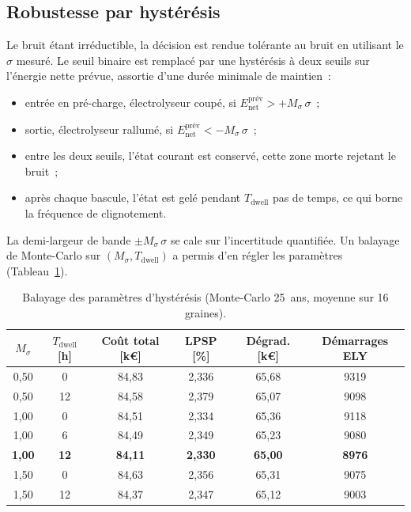 \subsection{Robustesse par hystérésis}
\label{subsec:hysteresis}

Le bruit étant irréductible, la décision est rendue tolérante au bruit en utilisant le $\sigma$ mesuré. Le seuil binaire est remplacé par une hystérésis à deux seuils sur l'énergie nette prévue, assortie d'une durée minimale de maintien~:
\begin{itemize}
  \setlength\itemsep{1pt}
  \item entrée en pré-charge, électrolyseur coupé, si $E_{\text{net}}^{\text{prév}} > +M_\sigma\,\sigma$~;
  \item sortie, électrolyseur rallumé, si $E_{\text{net}}^{\text{prév}} < -M_\sigma\,\sigma$~;
  \item entre les deux seuils, l'état courant est conservé, cette zone morte rejetant le bruit~;
  \item après chaque bascule, l'état est gelé pendant $T_{\text{dwell}}$ pas de temps, ce qui borne la fréquence de clignotement.
\end{itemize}
La demi-largeur de bande $\pm M_\sigma\,\sigma$ se cale sur l'incertitude quantifiée. Un balayage de Monte-Carlo sur $(M_\sigma, T_{\text{dwell}})$ a permis d'en régler les paramètres (Tableau~\ref{tab:hyst_sweep}).

\begin{table}[h!]
\centering
\caption{Balayage des paramètres d'hystérésis (Monte-Carlo 25~ans, moyenne sur 16 graines).}
\label{tab:hyst_sweep}
\begin{tabular}{cccccc}
\hline
$M_\sigma$ & $T_{\text{dwell}}$ [h] & Coût total [k€] & LPSP [\%] & Dégrad. [k€] & Démarrages ELY \\
\hline
0,50 & 0  & 84,83 & 2,336 & 65,68 & 9319 \\
0,50 & 12 & 84,58 & 2,379 & 65,07 & 9098 \\
1,00 & 0  & 84,51 & 2,334 & 65,36 & 9118 \\
1,00 & 6  & 84,49 & 2,349 & 65,23 & 9080 \\
\textbf{1,00} & \textbf{12} & \textbf{84,11} & \textbf{2,330} & \textbf{65,00} & \textbf{8976} \\
1,50 & 0  & 84,63 & 2,356 & 65,31 & 9075 \\
1,50 & 12 & 84,37 & 2,347 & 65,12 & 9003 \\
\hline
\end{tabular}
\end{table}

